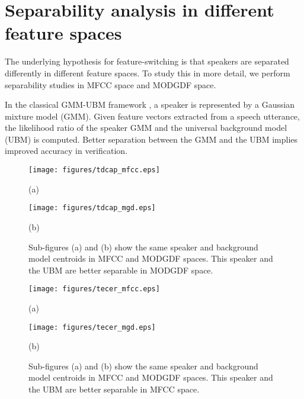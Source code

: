 \documentclass{article}
\begin{document}
\section{Separability analysis in different feature spaces}
\label{sec:separability}
The underlying hypothesis for feature-switching is that speakers are separated
differently in different feature spaces. To study this in more detail, we
perform separability studies in MFCC space and MODGDF space.

In the classical GMM-UBM framework \cite{reynoldsAdaptedGMM}, a speaker is
represented by a Gaussian mixture model (GMM). Given feature vectors extracted
from a speech utterance, the likelihood ratio of the speaker GMM and the
universal background model (UBM) is computed. Better separation between the GMM
and the UBM implies improved accuracy in verification.

\begin{figure}[h]
\centering 
\begin{minipage}[c]{0.5\textwidth}
\centering 
    \texttt{[image: figures/tdcap\_mfcc.eps]}
	\caption*{(a)}
\end{minipage}%
\begin{minipage}[c]{0.5\textwidth}
\centering  
    \texttt{[image: figures/tdcap\_mgd.eps]}
	\caption*{(b)}
\end{minipage}
\caption{Sub-figures (a) and (b) show the same speaker and background model
centroids in MFCC and MODGDF spaces. This speaker and the UBM are better
separable in MODGDF space.}
\label{fig:ubm_sep1}
\end{figure}

\begin{figure}[h]
\centering 
\begin{minipage}[c]{0.5\textwidth}
\centering 
    \texttt{[image: figures/tecer\_mfcc.eps]}
	\caption*{(a)}
\end{minipage}%
\begin{minipage}[c]{0.5\textwidth}
\centering  
    \texttt{[image: figures/tecer\_mgd.eps]}
	\caption*{(b)}
\end{minipage}
\caption{Sub-figures (a) and (b) show the same speaker and background model
centroids in MFCC and MODGDF spaces. This speaker and the UBM are better
separable in MFCC space.}
\label{fig:ubm_sep2}
\end{figure}
\end{document}
